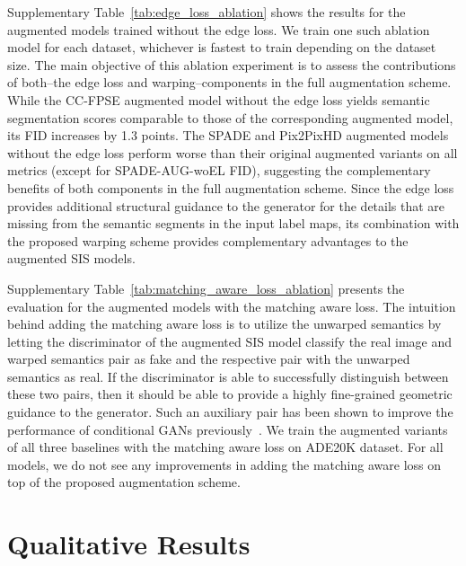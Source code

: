 \documentclass[final]{cvpr}
\newcommand\+{\mkern4mu}
\begin{document}
Supplementary Table~\ref{tab:edge_loss_ablation} shows the results for the augmented models trained without the edge loss. We train one such ablation model for each dataset, whichever is fastest to train depending on the dataset size. The main objective of this ablation experiment is to assess the contributions of both--the edge loss and warping--components in the full augmentation scheme. While the CC-FPSE augmented model without the edge loss yields semantic segmentation scores comparable to those of the corresponding augmented model, its FID increases by 1.3 points. The SPADE and Pix2PixHD augmented models without the edge loss perform worse than their original augmented variants on all metrics (except for SPADE-AUG-woEL FID), suggesting the complementary benefits of both components in the full augmentation scheme. Since the edge loss provides additional structural guidance to the generator for the details that are missing from the semantic segments in the input label maps, its combination with the proposed warping scheme provides complementary advantages to the augmented SIS models.

Supplementary Table~\ref{tab:matching_aware_loss_ablation} presents the evaluation for the augmented models with the matching aware loss. The intuition behind adding the matching aware loss is to utilize the unwarped semantics by letting the discriminator of the augmented SIS model classify the real image and warped semantics pair as fake and the respective pair with the unwarped semantics as real. If the discriminator is able to successfully distinguish between these two pairs, then it should be able to provide a highly fine-grained geometric guidance to the generator. Such an auxiliary pair has been shown to improve the performance of conditional GANs previously~\cite{ReedAYLSL16}. We train the augmented variants of all three baselines with the matching aware loss on ADE20K dataset. For all models, we do not see any improvements in adding the matching aware loss on top of the proposed augmentation scheme.
 \section{Qualitative Results}
\label{sec:qual_results}
\end{document}
